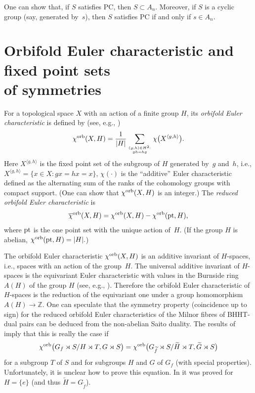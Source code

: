 \documentclass[pdftex]{sigma}
\numberwithin{equation}{section}
\begin{document}
One can show that, if $S$ satisfies PC, then $S \subset A_n$. Moreover, if $S$ is a cyclic group (say, generated by~$s$), then $S$ satisfies PC if and only if $s \in A_n$.

\section[Orbifold Euler characteristic and fixed point sets of symmetries]{Orbifold Euler characteristic and fixed point sets\\ of symmetries} \label{sect:orbifold}

For a topological space $X$ with an action of a finite group $H$, its {\em orbifold Euler characteristic}
is defined by (see, e.g., \cite{AS,HH})
\begin{gather}\label{eqn:chi_orb}
{\chi}^{\rm orb}(X,H)=\frac{1}{\vert H\vert}\sum_{{(g,h)\in H^2:}\atop{gh=hg}}\chi\big(X^{\langle g,h\rangle}\big).
\end{gather}
Here $X^{\langle g,h\rangle}$ is the fixed point set of the subgroup of $H$ generated by~$g$ and~$h$, i.e.,
$X^{\langle g,h\rangle}=\{x\in X\colon gx=hx=x\}$, $\chi(\cdot)$ is the ``additive'' Euler characteristic defined as the alternating sum of the ranks of the cohomology groups with compact support. (One can show that ${\chi}^{\rm orb}(X,H)$ is an integer.) The {\em reduced orbifold Euler characteristic} is
\[
{\overline{\chi}}^{ \rm orb}(X,H)={\chi}^{\rm orb}(X,H)-{\chi}^{\rm orb}({\rm pt},H),
\]
where ${\rm pt}$ is the one point set with the unique action of~$H$. (If the group $H$ is abelian,
${\chi}^{\rm orb}({\rm pt},H)=\vert H\vert.$)

The orbifold Euler characteristic ${\chi}^{\rm orb}(X,H)$ is an additive invariant of $H$-spaces, i.e., spaces with an action of the group~$H$. The universal additive invariant of $H$-spaces is the equivariant Euler characteristic with values in the Burnside ring $A(H)$ of the group $H$ (see, e.g., \cite[Section~3]{RMS}). Therefore the orbifold Euler characteristic of $H$-spaces is the reduction of the equivariant one under a group homomorphism $A(H)\to{\mathbb Z}$. One can speculate that the symmetry property (coincidence up to sign) for the reduced orbifold Euler characteristics of the Milnor fibres of BHHT-dual pairs can be deduced from the non-abelian Saito duality. The results of \cite{EG-IMRN} imply that this is really the case if
\[
 \chi^{\rm orb}\big(G_f\rtimes S/H\rtimes T, G\rtimes S\big)=
 \chi^{\rm orb}\big(G_{\widetilde{f}}\rtimes S/\widetilde{H}\rtimes T,
 \widetilde{G}\rtimes S\big)
\]
for a subgroup $T$ of $S$ and for subgroups $H$ and $G$ of $G_f$ (with special properties).
Unfortunately, it is unclear how to prove this equation. In \cite{EG-1811} it was proved for $H=\{e\}$
(and thus $\widetilde{H}=G_{\widetilde{f}}$).
\end{document}
